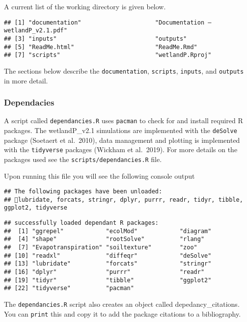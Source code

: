 \documentclass[
]{article}
\begin{document}
A current list of the working directory is given below.

\begin{verbatim}
## [1] "documentation"                     "Documentation – wetlandP_v2.1.pdf"
## [3] "inputs"                            "outputs"                          
## [5] "ReadMe.html"                       "ReadMe.Rmd"                       
## [7] "scripts"                           "wetlandP.Rproj"
\end{verbatim}

The sections below describe the \texttt{documentation},
\texttt{scripts}, \texttt{inputs}, and \texttt{outputs} in more detail.

\hypertarget{dependacies}{%
\subsubsection{Dependacies}\label{dependacies}}

A script called \texttt{dependancies.R} uses \texttt{pacman} to check
for and install required R packages. The wetlandP\_v2.1 simulations are
implemented with the \texttt{deSolve} package (Soetaert et al.~2010),
data management and plotting is implemented with the \texttt{tidyverse}
packages (Wickham et al.~2019). For more details on the packages used
see the \texttt{scripts/dependancies.R} file.

Upon running this file you will see the following console output

\begin{verbatim}
## The following packages have been unloaded:
## lubridate, forcats, stringr, dplyr, purrr, readr, tidyr, tibble, ggplot2, tidyverse
\end{verbatim}

\begin{verbatim}
## successfully loaded dependant R packages:
##  [1] "ggrepel"            "ecolMod"            "diagram"           
##  [4] "shape"              "rootSolve"          "rlang"             
##  [7] "Evapotranspiration" "soiltexture"        "zoo"               
## [10] "readxl"             "diffeqr"            "deSolve"           
## [13] "lubridate"          "forcats"            "stringr"           
## [16] "dplyr"              "purrr"              "readr"             
## [19] "tidyr"              "tibble"             "ggplot2"           
## [22] "tidyverse"          "pacman"
\end{verbatim}

The \texttt{dependancies.R} script also creates an object called
depedancy\_citations. You can \texttt{print} this and copy it to add the
package citations to a bibliography.
\end{document}
